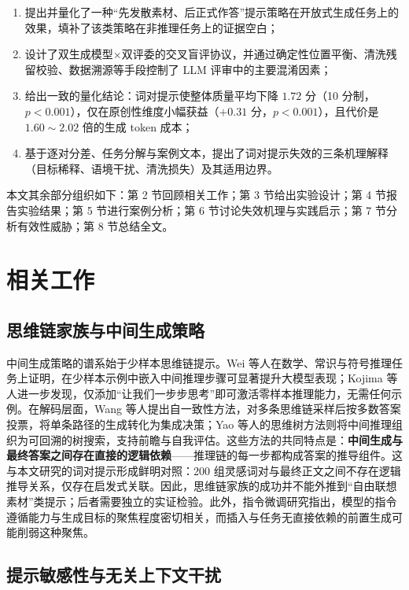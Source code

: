 \begin{enumerate}[leftmargin=2em, itemsep=0.15em]
  \item 提出并量化了一种“先发散素材、后正式作答”提示策略在开放式生成任务上的效果，填补了该类策略在非推理任务上的证据空白；
  \item 设计了双生成模型$\times$双评委的交叉盲评协议，并通过确定性位置平衡、清洗残留校验、数据溯源等手段控制了 LLM 评审中的主要混淆因素\cite{zheng2023judging}；
  \item 给出一致的量化结论：词对提示使整体质量平均下降 $1.72$ 分（10 分制，$p<0.001$），仅在原创性维度小幅获益（$+0.31$ 分，$p<0.001$），且代价是 $1.60\sim2.02$ 倍的生成 token 成本；
  \item 基于逐对分差、任务分解与案例文本，提出了词对提示失效的三条机理解释（目标稀释、语境干扰、清洗损失）及其适用边界。
\end{enumerate}

本文其余部分组织如下：第 2 节回顾相关工作；第 3 节给出实验设计；第 4 节报告实验结果；第 5 节进行案例分析；第 6 节讨论失效机理与实践启示；第 7 节分析有效性威胁；第 8 节总结全文。

\section{相关工作}

\subsection{思维链家族与中间生成策略}

中间生成策略的谱系始于少样本思维链提示。Wei 等人在数学、常识与符号推理任务上证明，在少样本示例中嵌入中间推理步骤可显著提升大模型表现\cite{wei2022cot}；Kojima 等人进一步发现，仅添加“让我们一步步思考”即可激活零样本推理能力，无需任何示例\cite{kojima2022zeroshot}。在解码层面，Wang 等人提出自一致性方法，对多条思维链采样后按多数答案投票，将单条路径的生成转化为集成决策\cite{wang2023selfconsistency}；Yao 等人的思维树方法则将中间推理组织为可回溯的树搜索，支持前瞻与自我评估\cite{yao2023tot}。这些方法的共同特点是：\textbf{中间生成与最终答案之间存在直接的逻辑依赖}——推理链的每一步都构成答案的推导组件。这与本文研究的词对提示形成鲜明对照：200 组灵感词对与最终正文之间不存在逻辑推导关系，仅存在启发式关联。因此，思维链家族的成功并不能外推到“自由联想素材”类提示；后者需要独立的实证检验。此外，指令微调研究指出，模型的指令遵循能力与生成目标的聚焦程度密切相关\cite{ouyang2022instructgpt}，而插入与任务无直接依赖的前置生成可能削弱这种聚焦。

\subsection{提示敏感性与无关上下文干扰}

